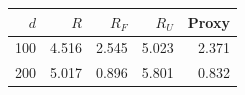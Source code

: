 \begin{tabular}{rrrrr}\toprule
$d$ & $R$ & $R_F$ & $R_U$ & Proxy \\ \midrule
100 & 4.516 & 2.545 & 5.023 & 2.371 \\
200 & 5.017 & 0.896 & 5.801 & 0.832 \\
\bottomrule\end{tabular}
